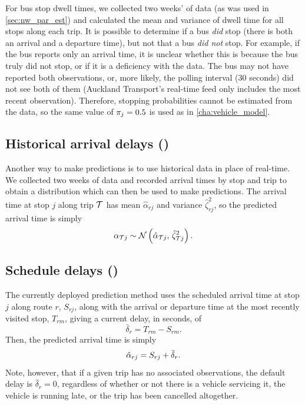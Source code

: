 For bus stop dwell times, we collected two weeks' of data (as was used in \cref{sec:nw_par_est}) and calculated the mean and variance of dwell time for all stops along each trip. It is possible to determine if a bus \emph{did} stop (there is both an arrival and a departure time), but not that a bus \emph{did not} stop. For example, if the bus reports only an arrival time, it is unclear whether this is because the bus truly did not stop, or if it is a deficiency with the data. The bus may not have reported both observations, or, more likely, the polling interval (30 seconds) did not see both of them (Auckland Transport's real-time feed only includes the most recent observation). Therefore, stopping probabilities cannot be estimated from the data, so the same value of $\pi_j=0.5$ is used as in \cref{cha:vehicle_model}.





\subsection{Historical arrival delays (\Fhist{})}
\label{eq:prediction_arrival_historical}

Another way to make predictions is to use historical data in place of real-time. We collected two weeks of data and recorded arrival times by stop and trip to obtain a distribution which can then be used to make predictions. The arrival time at stop $j$ along trip $\mathcal{T}$ has mean $\hat\alpha_{rj}$ and variance $\hat\zeta_{rj}^2$, so the predicted arrival time is simply
\begin{equation}
\label{eq:arrival_pred_historical}
\alpha_{\mathcal{T} j} \sim \mathcal{N}\left(\hat\alpha_{\mathcal{T} j},\, \hat\zeta_{\mathcal{T} j}^2\right).
\end{equation}


\subsection{Schedule delays (\Fsched{})}
\label{eq:prediction_arrival_sched_delay}

The currently deployed prediction method uses the scheduled arrival time at stop $j$ along route $r$, $S_{rj}$, along with the arrival or departure time at the most recently visited stop, $T_{rm}$, giving a current delay, in seconds, of
\begin{equation}
\label{eq:sched_cur_delay}
\bar\delta_{r} = T_{rm} - S_{rm}.
\end{equation}
Then, the predicted arrival time is simply
\begin{equation}
\label{eq:sched_pred_arr}
\hat{\alpha}_{rj} = S_{rj} + \bar\delta_r.
\end{equation}
Note, however, that if a given trip has no associated observations, the default delay is $\bar\delta_r = 0$, regardless of whether or not there is a vehicle servicing it, the vehicle is running late, or the trip has been cancelled altogether.
